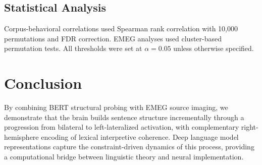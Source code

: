 \documentclass[11pt]{article}
\begin{document}
\subsection{Statistical Analysis}
Corpus-behavioral correlations used Spearman rank correlation with 10,000 permutations and FDR correction. EMEG analyses used cluster-based permutation tests. All thresholds were set at $\alpha = 0.05$ unless otherwise specified.

\section{Conclusion}

By combining BERT structural probing with EMEG source imaging, we demonstrate that the brain builds sentence structure incrementally through a progression from bilateral to left-lateralized activation, with complementary right-hemisphere encoding of lexical interpretive coherence. Deep language model representations capture the constraint-driven dynamics of this process, providing a computational bridge between linguistic theory and neural implementation.



\end{document}
